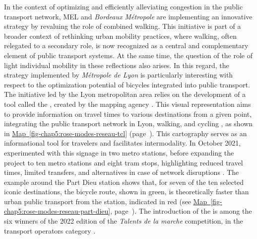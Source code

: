 \begin{refsegment}
    In the context of optimizing and efficiently alleviating congestion in the public transport network, \acrshort{MEL} and \textsl{Bordeaux Métropole} are implementing an innovative strategy by revaluing the role of combined walking. This initiative is part of a broader context of rethinking urban mobility practices, where walking, often relegated to a secondary role, is now recognized as a central and complementary element of public transport systems. At the same time, the question of the role of light individual mobility in these reflections also arises. In this regard, the strategy implemented by \textsl{Métropole de Lyon} is particularly interesting with respect to the optimization potential of bicycles integrated into public transport. The initiative led by the Lyon metropolitan area relies on the development of a tool called the , created by the mapping agency . This visual representation aims to provide information on travel times to various destinations from a given point, integrating the public transport network in Lyon, walking, and cycling \textcolor{blue}{\autocite{latitude-cartagene_rose_nodate}}, as shown in \hyperref[fig-chap5:rose-modes-reseau-tcl]{Map~\ref{fig-chap5:rose-modes-reseau-tcl}} (page~\pageref{fig-chap5:rose-modes-reseau-tcl}). This \gls{cartography} serves as an informational tool for travelers and facilitates intermodality. In October 2021, \textcolor{blue}{\textcite[15]{keolis_lyon_rapport_2022}} experimented with this signage in two metro stations, before expanding the project to ten metro stations and eight tram stops, highlighting reduced travel times, limited transfers, and alternatives in case of network disruptions \textcolor{blue}{\autocite[15]{keolis_lyon_rapport_2022}}. The example around the Part Dieu station shows that, for seven of the ten selected iconic destinations, the bicycle route, shown in green, is theoretically faster than urban public transport from the station, indicated in red (see \hyperref[fig-chap5:rose-modes-reseau-part-dieu]{Map~\ref{fig-chap5:rose-modes-reseau-part-dieu}}, page~\pageref{fig-chap5:rose-modes-reseau-part-dieu}). The introduction of the  is among the six winners of the 2022 edition of the \textsl{Talents de la marche} competition, in the transport operators category \textcolor{blue}{\autocite{club_des_villes_et_territoires_cyclables_six_nodate}}.%


\end{refsegment}
